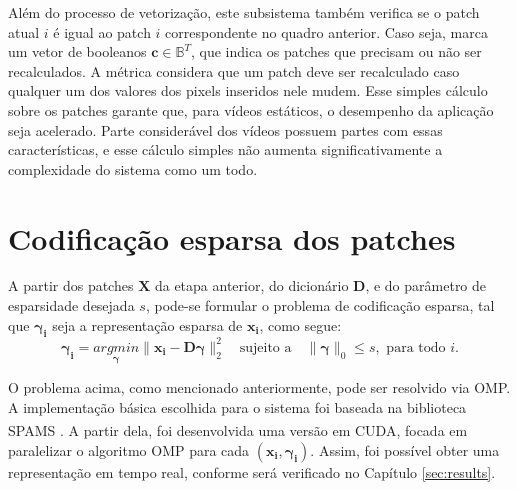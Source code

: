 \documentclass[cic,tc]{iiufrgs}
\renewcommand{\vec}[1]{\bm{#1}}
\newcommand{\mat}[1]{\bm{#1}}
\newcommand{\reg}{\textsuperscript{\textregistered}}
\begin{document}
Além do processo de vetorização, este subsistema também verifica se o patch atual $i$ é 
igual ao patch $i$ correspondente no quadro anterior. 
Caso seja, marca um vetor de booleanos $\vec{c}\in \mathbb{B}^T$, que indica os 
patches que precisam ou não ser recalculados.
A métrica considera que um patch deve ser recalculado caso qualquer um dos valores dos 
pixels inseridos nele mudem.
Esse simples cálculo sobre os patches garante que, para vídeos estáticos, o desempenho
da aplicação seja acelerado.
Parte considerável dos vídeos possuem partes com essas características, e esse cálculo simples
não aumenta significativamente a complexidade do sistema como um todo.

\section{Codificação esparsa dos patches}
A partir dos patches $\mat{X}$ da etapa anterior, do dicionário $\mat{D}$, e do parâmetro 
de esparsidade desejada $s$, pode-se formular o problema de codificação esparsa, tal que 
$\vec{\gamma_i}$ seja a representação esparsa de $\vec{x_i}$, como segue:
\begin{equation}
    \vec{\gamma_i} = \underset{\vec{\gamma}}{argmin} \lVert \vec{x_i} - \mat{D}\vec{\gamma} \rVert_2^2
    \hspace{1em} \text{sujeito a} \hspace{1em}
    \lVert \vec{\gamma} \rVert_0 \le s,
    \text{ para todo } i.
\end{equation}

O problema acima, como mencionado anteriormente, pode ser resolvido via OMP.
A implementação básica escolhida para o sistema foi baseada na biblioteca SPAMS \cite{SPAMS}.
A partir dela, foi desenvolvida uma versão em CUDA\reg, focada em paralelizar o algoritmo
OMP para cada $(\vec{x_i}, \vec{\gamma_i})$. Assim, foi possível obter uma representação
em tempo real, conforme será verificado no Capítulo \ref{sec:results}.
\end{document}

